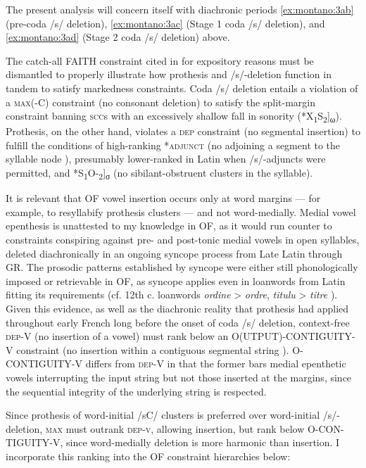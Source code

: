 \documentclass[output=paper,colorlinks,citecolor=brown,
]{langscibook}
\begin{document}
\noindent The present analysis will concern itself with diachronic periods \ref{ex:montano:3ab} (pre-coda /s/ deletion), \ref{ex:montano:3ac} (Stage 1 coda /s/ deletion), and \ref{ex:montano:3ad} (Stage 2 coda /s/ deletion) above.

The catch-all FAITH constraint cited in  for expository reasons must be dismantled to properly illustrate how prothesis and /s/-deletion function in tandem to satisfy markedness constraints. Coda /s/ deletion entails a violation of a \textsc{max}(-C) constraint (no consonant deletion) to satisfy the split-margin constraint banning \textsc{scc}s with an excessively shallow fall in sonority (*X\textsubscript{1}S\textsubscript{2}]\textsubscript{ω}).  Prothesis, on the other hand, violates a \textsc{dep} constraint (no segmental insertion) to fulfill the conditions of high-ranking *\textsc{adjunct} (no adjoining a segment to the syllable node \citep{Barlow2001}), presumably lower-ranked in Latin when /s/-adjuncts were permitted, and *S\textsubscript{1}O-\textsubscript{2}]\textsubscript{σ} (no sibilant-obstruent clusters in the syllable).

It is relevant that OF vowel insertion occurs only at word margins — for example, to resyllabify prothesis clusters — and not word-medially.  Medial vowel epenthesis is unattested to my knowledge in OF, as it would run counter to constraints conspiring against pre- and post-tonic medial vowels in open syllables, deleted diachronically in an ongoing syncope process from Late Latin through GR.  The prosodic patterns established by syncope were either still phonologically imposed or retrievable in OF, as syncope applies even in loanwords from Latin fitting its requirements (cf. 12th c. loanwords \textit{ordine} > \textit{ordre}, \textit{titulu} > \textit{titre} \citep{Pope1952}).  Given this evidence, as well as the diachronic reality that prothesis had applied throughout early French long before the onset of coda /s/ deletion, context-free \textsc{dep}-V (no insertion of a vowel) must rank below an O(UTPUT)-CONTIGUITY-V constraint (no insertion within a contiguous segmental string \citep{Krämer2005}).  O-CONTIGUITY-V differs from \textsc{dep}-V in that the former bars medial epenthetic vowels interrupting the input string but not those inserted at the margins, since the sequential integrity of the underlying string is respected.

Since prothesis of word-initial /sC/ clusters is preferred over word-initial /s/-deletion, \textsc{max} must outrank \textsc{dep-v}, allowing insertion, but rank below O-CON-TIGUITY-V, since word-medially deletion is more harmonic than insertion.  I incorporate this ranking into the OF constraint hierarchies below:
\end{document}
